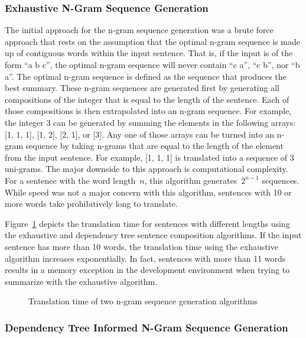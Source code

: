 \documentclass{article}[10]
\begin{document}
\subsubsection{Exhaustive N-Gram Sequence Generation\label{sec:exhaustive}}

The initial approach for the n-gram sequence generation was a brute
force approach that rests on the assumption that the optimal n-gram
sequence is made up of contiguous words within the input sentence. That
is, if the input is of the form ``a b c'', the optimal n-gram sequence
will never contain ``c a'', ``c b'', nor ``b a''. The optimal n-gram
sequence is defined as the sequence that produces the best summary.
These n-gram sequences are generated first by generating all
compositions of the integer that is equal to the length of the sentence.
Each of those compositions is then extrapolated into an n-gram sequence.
For example, the integer 3 can be generated by summing the elements in
the following arrays: [1, 1, 1], [1, 2], [2, 1], or [3].
Any one of those arrays can be turned into an n-gram sequence by taking
n-grams that are equal to the length of the element from the input
sentence. For example, [1, 1, 1] is translated into a sequence of 3
uni-grams. The major downside to this approach is computational
complexity. For a sentence with the word length~\(n\), this
algorithm generates~\(2^{n-1}\) sequences. While speed was not a
major concern with this algorithm, sentences with 10 or more words take
prohibitively long to translate.

Figure~\ref{fig:timing} depicts the translation time
for sentences with different lengths using the exhaustive and dependency
tree sentence composition algorithms. If the input sentence has more
than 10 words, the translation time using the exhaustive algorithm
increases exponentially. In fact, sentences with more than 11 words
results in a memory exception in the development environment when
trying to summarize with the exhaustive algorithm.

\begin{figure}[h]
  \begin{center}
    \scalebox{0.6}{}
    \caption{Translation time of two n-gram sequence generation
      algorithms\label{fig:timing}}
  \end{center}
\end{figure}

\subsubsection{Dependency Tree Informed N-Gram Sequence Generation\label{sec:dependency}}
\end{document}
